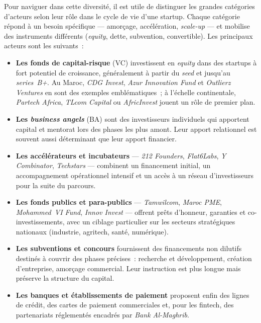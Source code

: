 Pour naviguer dans cette diversité, il est utile de distinguer les grandes catégories d'acteurs selon leur rôle dans le cycle de vie d'une startup. Chaque catégorie répond à un besoin spécifique --- amorçage, accélération, \textit{scale-up} --- et mobilise des instruments différents (\textit{equity}, dette, subvention, convertible). Les principaux acteurs sont les suivants~:

\begin{itemize}
  \item \textbf{Les fonds de capital-risque} (\ac{VC}) investissent en \textit{equity} dans des startups à fort potentiel de croissance, généralement à partir du \textit{seed} et jusqu'au \textit{series~B+}. Au Maroc, \textit{CDG Invest}, \textit{Azur Innovation Fund} et \textit{Outlierz Ventures} en sont des exemples emblématiques~; à l'échelle continentale, \textit{Partech Africa}, \textit{TLcom Capital} ou \textit{AfricInvest} jouent un rôle de premier plan.
  \item \textbf{Les \textit{business angels}} (\ac{BA}) sont des investisseurs individuels qui apportent capital et mentorat lors des phases les plus amont. Leur apport relationnel est souvent aussi déterminant que leur apport financier.
  \item \textbf{Les accélérateurs et incubateurs} --- \textit{212 Founders}, \textit{Flat6Labs}, \textit{Y Combinator}, \textit{Techstars} --- combinent un financement initial, un accompagnement opérationnel intensif et un accès à un réseau d'investisseurs pour la suite du parcours.
  \item \textbf{Les fonds publics et para-publics} --- \textit{Tamwilcom}, \textit{Maroc PME}, \textit{Mohammed~VI Fund}, \textit{Innov Invest} --- offrent prêts d'honneur, garanties et co-investissements, avec un ciblage particulier sur les secteurs stratégiques nationaux (industrie, agritech, santé, numérique).
  \item \textbf{Les subventions et concours} fournissent des financements non dilutifs destinés à couvrir des phases précises~: recherche et développement, création d'entreprise, amorçage commercial. Leur instruction est plus longue mais préserve la structure du capital.
  \item \textbf{Les banques et établissements de paiement} proposent enfin des lignes de crédit, des cartes de paiement commerciales et, pour les fintech, des partenariats réglementés encadrés par \textit{Bank Al-Maghrib}.
\end{itemize}

